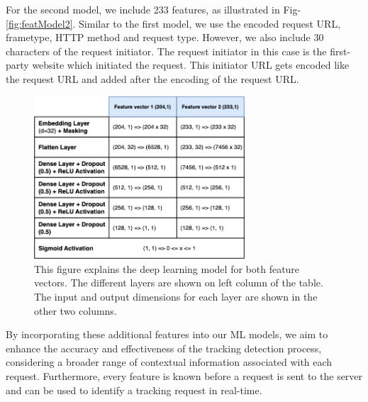 For the second model, we include 233 features, as illustrated in Fig-\ref{fig:featModel2}. Similar to the first model,
we use the encoded request URL, frametype, HTTP method and request type. However, we also include
30 characters of the request initiator. The request initiator in this case is the first-party website which initiated the request. This 
initiator URL gets encoded like the request URL and added after the encoding of the request URL.

\begin{figure}[ht!]
  \begin{center}
    \includegraphics[width=0.7\textwidth]{images/DL.png}
  \end{center}
  \caption{This figure explains the deep learning model for both feature vectors. The different layers are shown on left column of the table. The input
  and output dimensions for each layer are shown in the other two columns.}
  \label{fig:modelStructure}
\end{figure}

By incorporating these additional features into our ML models, we aim to enhance the accuracy and effectiveness of
the tracking detection process, considering a broader range of contextual information associated with each request. 
Furthermore, every feature is known before a request is sent to the server and can be used to identify a tracking request
in real-time.

